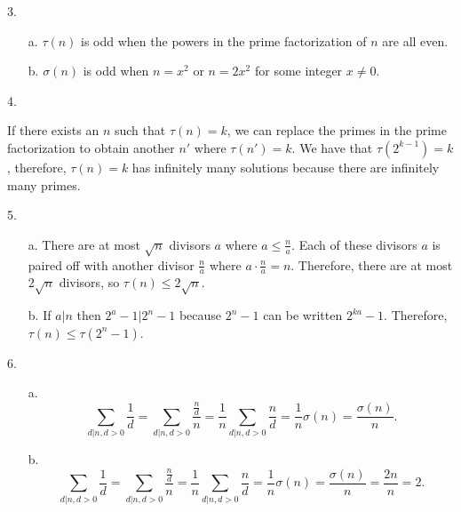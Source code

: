 \documentclass[11pt]{article}
\begin{document}
\begin{flushleft}
3.
\end{flushleft}
\begin{enumerate}
    \item[a.] $\tau(n)$ is odd when the powers in the prime factorization of $n$ are all even.
    \item[b.] $\sigma(n)$ is odd when $n=x^2$ or $n=2x^2$ for some integer $x\neq 0$. 
\end{enumerate}

\begin{flushleft}
4.
\end{flushleft}
If there exists an $n$ such that $\tau(n)=k$, we can replace the primes in the prime factorization
to obtain another $n'$ where $\tau(n')=k$. We have that $\tau(2^{k-1})=k$, therefore, $\tau(n)=k$ has 
infinitely many solutions because there are infinitely many primes.

\begin{flushleft}
5.
\end{flushleft}
\begin{enumerate}
    \item [a.] There are at most $\sqrt{n}$ divisors $a$ where $a\leq \frac{n}{a}$. Each of these divisors $a$ is paired off with another divisor $\frac{n}{a}$
    where $a\cdot\frac{n}{a}=n$. Therefore, there are at most $2\sqrt{n}$ divisors, so $\tau(n)\leq 2\sqrt{n}$.
    \item [b.] If $a\vert n$ then $2^{a}-1\vert 2^n-1$ because $2^n-1$ can be written $2^{ka}-1$. Therefore, $\tau(n)\leq\tau(2^n-1)$.
\end{enumerate}


\begin{flushleft}
6.
\end{flushleft}
\begin{enumerate}
    \item [a.]
        \[\sum_{d\vert n, d>0}\frac{1}{d}=\sum_{d\vert n, d>0}\frac{\frac{n}{d}}{n}
            =\frac{1}{n}\sum_{d\vert n, d>0}\frac{n}{d}
            =\frac{1}{n}\sigma(n)
            =\frac{\sigma(n)}{n}.\]
    \item [b.]
        \[
            \sum_{d\vert n, d>0}\frac{1}{d}=\sum_{d\vert n, d>0}\frac{\frac{n}{d}}{n}
            =\frac{1}{n}\sum_{d\vert n, d>0}\frac{n}{d}
            =\frac{1}{n}\sigma(n)
            =\frac{\sigma(n)}{n}
            =\frac{2n}{n}
            =2.\]

\end{enumerate}
\end{document}

